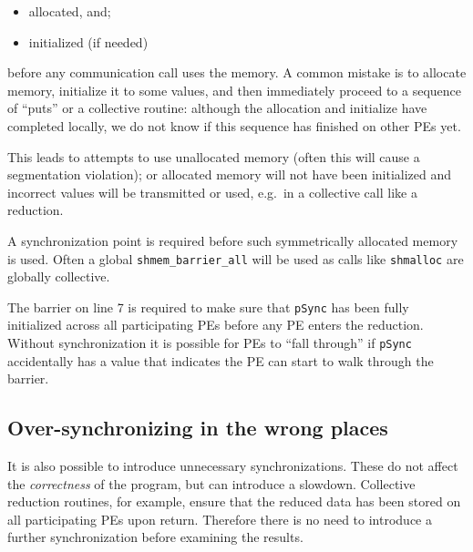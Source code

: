 \begin{itemize}
\item allocated, and;
\item initialized (if needed)
\end{itemize}

before any communication call uses the memory.  A common mistake is to
allocate memory, initialize it to some values, and then immediately
proceed to a sequence of ``puts'' or a collective routine: although
the allocation and initialize have completed locally, we do not know
if this sequence has finished on other PEs yet.

This leads to attempts to use unallocated memory (often this will
cause a segmentation violation); or allocated memory will not have been
initialized and incorrect values will be transmitted or used, e.g.\ in a
collective call like a reduction.

A synchronization point is required before such symmetrically
allocated memory is used.  Often a global \texttt{shmem\_barrier\_all}
will be used as calls like \texttt{shmalloc} are globally collective.

\begin{minipage}{\linewidth}
\vspace{0.1in}
\vspace{0.1in}
\end{minipage}

The barrier on line 7 is required to make sure that \texttt{pSync} has
been fully initialized across all participating PEs before any PE
enters the reduction.  Without synchronization it is possible for PEs
to ``fall through'' if \texttt{pSync} accidentally has a value that
indicates the PE can start to walk through the barrier.

\subsection{Over-synchronizing in the wrong places}


It is also possible to introduce unnecessary synchronizations.  These
do not affect the \emph{correctness} of the program, but can introduce
a slowdown.  Collective reduction routines, for example, ensure that
the reduced data has been stored on all participating PEs upon return.
Therefore there is no need to introduce a further synchronization
before examining the results.

